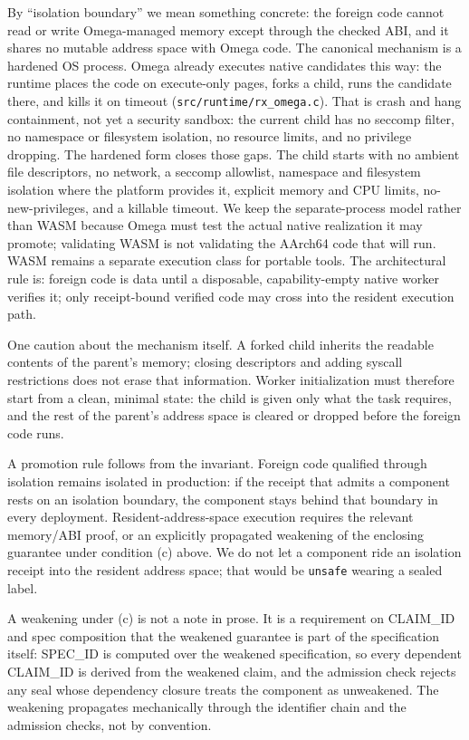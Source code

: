 \documentclass[11pt]{article}
\begin{document}
By ``isolation boundary'' we mean something concrete: the foreign code
cannot read or write Omega-managed memory except through the checked ABI,
and it shares no mutable address space with Omega code. The canonical
mechanism is a hardened OS process. Omega already executes native
candidates this way: the runtime places the code on execute-only pages,
forks a child, runs the candidate there, and kills it on timeout
(\texttt{src/runtime/rx\_omega.c}). That is crash and hang containment,
not yet a security sandbox: the current child has no seccomp filter, no
namespace or filesystem isolation, no resource limits, and no privilege
dropping. The hardened form closes those gaps. The child starts with no
ambient file descriptors, no network, a seccomp allowlist, namespace and
filesystem isolation where the platform provides it, explicit memory and
CPU limits, no-new-privileges, and a killable timeout. We keep the
separate-process model rather than WASM because Omega must test the
actual native realization it may promote; validating WASM is not
validating the AArch64 code that will run. WASM remains a separate
execution class for portable tools. The architectural rule is: foreign
code is data until a disposable, capability-empty native worker verifies
it; only receipt-bound verified code may cross into the resident
execution path.

One caution about the mechanism itself. A forked child inherits the
readable contents of the parent's memory; closing descriptors and adding
syscall restrictions does not erase that information. Worker
initialization must therefore start from a clean, minimal state: the
child is given only what the task requires, and the rest of the parent's
address space is cleared or dropped before the foreign code runs.

A promotion rule follows from the invariant. Foreign code qualified
through isolation remains isolated in production: if the receipt that
admits a component rests on an isolation boundary, the component stays
behind that boundary in every deployment. Resident-address-space
execution requires the relevant memory/ABI proof, or an explicitly
propagated weakening of the enclosing guarantee under condition (c)
above. We do not let a component ride an isolation receipt into the
resident address space; that would be \texttt{unsafe} wearing a sealed
label.

A weakening under (c) is not a note in prose. It is a requirement on
CLAIM\_ID and spec composition that the weakened guarantee is part of
the specification itself: SPEC\_ID is computed over the weakened
specification, so every dependent CLAIM\_ID is derived from the weakened
claim, and the admission check rejects any seal whose dependency closure
treats the component as unweakened. The weakening propagates mechanically
through the identifier chain and the admission checks, not by convention.
\end{document}
